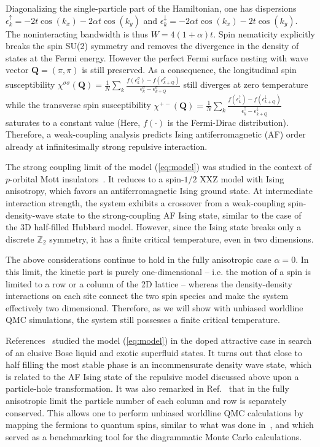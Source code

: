 \documentclass[twocolumn,superscriptaddress,pra,showpacs,longbibliography]{revtex4-1}
\newcommand{\<}{\langle}
\renewcommand{\>}{\rangle}
\begin{document}
Diagonalizing the single-particle part of the Hamiltonian, one has dispersions $\epsilon_{k}^{\uparrow} = -2t \cos(k_{x}) -2\alpha t \cos(k_{y})$ and $\epsilon_{k}^{\downarrow} = -2 \alpha t \cos(k_{x}) -2 t \cos(k_{y})$. The noninteracting bandwidth is thus $W=4(1+\alpha)t$.
Spin nematicity explicitly breaks the spin SU(2) symmetry and removes the divergence in the density of states at the Fermi energy. However the perfect Fermi surface nesting with wave vector $\pmb{Q}=(\pi, \pi)$ is still preserved. As a consequence, the longitudinal spin susceptibility $\chi^{\sigma\sigma}(\pmb{Q})=\frac{1}{N}\sum_{k}\frac{f(\epsilon_{k}^{\sigma})-f(\epsilon^{\sigma}_{k+Q})}{\epsilon_{k}^{\sigma} - \epsilon_{k+Q}^{\sigma}}$ still diverges at zero temperature while the transverse spin susceptibility $\chi^{+-}(\pmb{Q})=\frac{1}{N}\sum_{k}\frac{f(\epsilon_{k}^{\uparrow})-f(\epsilon^{\downarrow}_{k+Q})}{\epsilon_{k}^{\uparrow} - \epsilon_{k+Q}^{\downarrow}}$ saturates to a constant value (Here, $f(\cdot)$ is the Fermi-Dirac distribution). Therefore, a weak-coupling analysis predicts Ising antiferromagnetic (AF) order already at infinitesimally strong repulsive interaction. 

The strong coupling limit of the model (\ref{eq:model}) was studied in the context of $p$-orbital Mott insulators~\cite{Wu:2008ea, Zhao:2008ev}. It reduces to a spin-$1/2$ XXZ model with Ising anisotropy, which favors an antiferromagnetic Ising ground state. At intermediate interaction strength, the system exhibits a crossover from a weak-coupling spin-density-wave state to the strong-coupling AF Ising state, similar to the case of  the 3D half-filled Hubbard model. However, since the Ising state breaks only a discrete $\mathbb{Z}_{2}$ symmetry, it has a finite critical temperature, even in two dimensions. 

The above considerations continue to hold in the fully anisotropic case $\alpha=0$. In this limit, the kinetic part is purely one-dimensional -- i.e. the motion of a spin is limited to a row or a column of the 2D lattice -- whereas the density-density interactions on each site connect the two spin species and make the system effectively two dimensional. Therefore, as we will show with unbiased worldline QMC simulations, the system still possesses a finite critical temperature.   

 
References~\cite{Feiguin:2009iu,Feiguin:2011jz,Gukelberger:2014dba} studied the model (\ref{eq:model}) in the doped attractive case in search of an elusive Bose liquid  and exotic superfluid states. It turns out that close to half filling the most stable phase is an incommensurate density wave state, which is related to the AF Ising state of the repulsive model discussed above upon a particle-hole transformation. It was also remarked in Ref.~\cite{Gukelberger:2014dba} that in the fully anisotropic limit the particle number of each column and row  is separately conserved. This allows one to perform unbiased worldline QMC calculations by mapping the fermions to quantum spins, similar to what was done in~\cite{Xu:2015gx}, and which served as a benchmarking tool for the diagrammatic Monte Carlo calculations.
\end{document}
